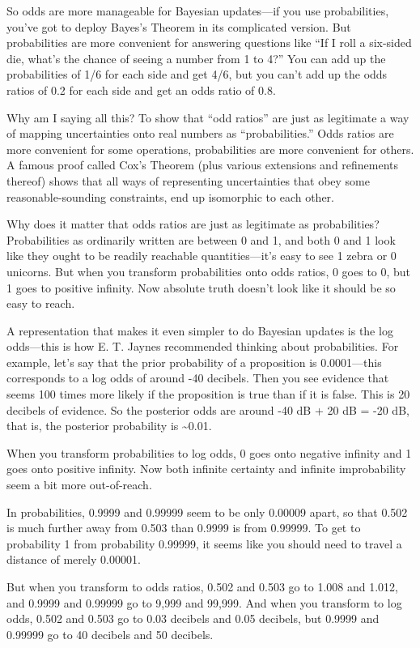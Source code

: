 {
 So odds are more manageable for Bayesian updates---if you use
probabilities, you've got to deploy
Bayes's Theorem in its complicated version. But
probabilities are more convenient for answering questions like
``If I roll a six-sided die, what's
the chance of seeing a number from 1 to 4?'' You can
add up the probabilities of 1/6 for each side and get 4/6, but you
can't add up the odds ratios of 0.2 for each side and
get an odds ratio of 0.8.}

{
 Why am I saying all this? To show that ``odd
ratios'' are just as legitimate a way of mapping
uncertainties onto real numbers as
``probabilities.'' Odds ratios are
more convenient for some operations, probabilities are more convenient
for others. A famous proof called Cox's Theorem (plus
various extensions and refinements thereof) shows that all ways of
representing uncertainties that obey some reasonable-sounding
constraints, end up isomorphic to each other.}

{
 Why does it matter that odds ratios are just as legitimate as
probabilities? Probabilities as ordinarily written are between 0 and 1,
and both 0 and 1 look like they ought to be readily reachable
quantities---it's easy to see 1 zebra or 0 unicorns.
But when you transform probabilities onto odds ratios, 0 goes to 0, but
1 goes to positive infinity. Now absolute truth doesn't
look like it should be so easy to reach.}

{
 A representation that makes it even simpler to do Bayesian updates
is the log odds---this is how E. T. Jaynes recommended thinking about
probabilities. For example, let's say that the prior
probability of a proposition is 0.0001---this corresponds to a log odds
of around -40 decibels. Then you see evidence that seems 100 times more
likely if the proposition is true than if it is false. This is 20
decibels of evidence. So the posterior odds are around -40 dB + 20 dB =
-20 dB, that is, the posterior probability is \~{}0.01.}

{
 When you transform probabilities to log odds, 0 goes onto negative
infinity and 1 goes onto positive infinity. Now both infinite certainty
and infinite improbability seem a bit more out-of-reach.}

{
 In probabilities, 0.9999 and 0.99999 seem to be only 0.00009
apart, so that 0.502 is much further away from 0.503 than 0.9999 is
from 0.99999. To get to probability 1 from probability 0.99999, it
seems like you should need to travel a distance of merely 0.00001.}

{
 But when you transform to odds ratios, 0.502 and 0.503 go to 1.008
and 1.012, and 0.9999 and 0.99999 go to 9,999 and 99,999. And when you
transform to log odds, 0.502 and 0.503 go to 0.03 decibels and 0.05
decibels, but 0.9999 and 0.99999 go to 40 decibels and 50 decibels.}

